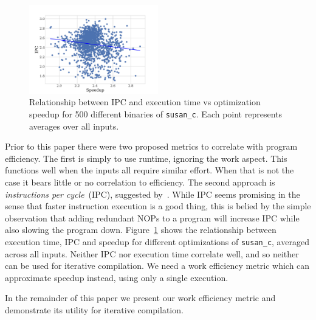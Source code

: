     \begin{figure}[t]
        \centering
        \includegraphics[width=0.5\textwidth]{figs/motivation-metric.pdf}
        \caption{
            Relationship between IPC and execution time vs optimization speedup for 500 different binaries of \texttt{susan\_c}.
            Each point represents averages over all inputs.
        }
        \label{fig:motivation-metric}
    \end{figure}
    
    Prior to this paper there were two proposed metrics to correlate with program efficiency. The first is simply to use runtime, ignoring
    the work aspect. This functions well when the inputs all require similar effort. When that is not the case it bears little or no
    correlation to efficiency. The second approach is \textit{instructions per cycle}~(IPC), suggested by~\citep{fursin07}. While IPC seems
    promising in the sense that faster instruction execution is a good thing, this is belied by the simple observation that adding
    redundant NOPs to a program will increase IPC while also slowing the program down. Figure~\ref{fig:motivation-metric} shows the
    relationship between execution time, IPC and speedup for different optimizations of \texttt{susan\_c}, averaged across all inputs.
    Neither IPC nor execution time correlate well, and so neither can be used for iterative compilation. We need a work efficiency metric
    which can approximate speedup instead, using only a single execution. 

    In the remainder of this paper we present our work efficiency metric and demonstrate its utility for iterative compilation.
